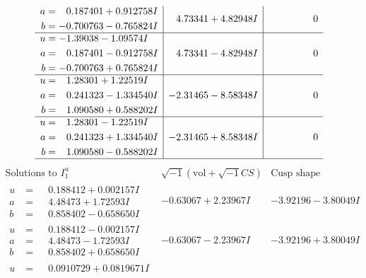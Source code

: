 \documentclass[1p]{elsarticle_modified}
\theoremstyle{definition}
\newcommand{\I}{\sqrt{-1}}
\begin{document}
$$\begin{array}{c|c|c}
\begin{aligned}
a &= \phantom{-}0.187401 + 0.912758 I \\
b &= -0.700763 - 0.765824 I\end{aligned}
 & \phantom{-}4.73341 + 4.82948 I & \phantom{-0.000000 } 0 \\ \hline\begin{aligned}
u &= -1.39038 - 1.09574 I \\
a &= \phantom{-}0.187401 - 0.912758 I \\
b &= -0.700763 + 0.765824 I\end{aligned}
 & \phantom{-}4.73341 - 4.82948 I & \phantom{-0.000000 } 0 \\ \hline\begin{aligned}
u &= \phantom{-}1.28301 + 1.22519 I \\
a &= \phantom{-}0.241323 - 1.334540 I \\
b &= \phantom{-}1.090580 + 0.588202 I\end{aligned}
 & -2.31465 - 8.58348 I & \phantom{-0.000000 } 0 \\ \hline\begin{aligned}
u &= \phantom{-}1.28301 - 1.22519 I \\
a &= \phantom{-}0.241323 + 1.334540 I \\
b &= \phantom{-}1.090580 - 0.588202 I\end{aligned}
 & -2.31465 + 8.58348 I & \phantom{-0.000000 } 0\\
 \hline 
 \end{array}$$\newpage$$\begin{array}{c|c|c}  
\text{Solutions to }I^u_{1}& \I (\text{vol} + \sqrt{-1}CS) & \text{Cusp shape}\\
 \hline 
\begin{aligned}
u &= \phantom{-}0.188412 + 0.002157 I \\
a &= \phantom{-}4.48473 + 1.72593 I \\
b &= \phantom{-}0.858402 - 0.658650 I\end{aligned}
 & -0.63067 + 2.23967 I & -3.92196 - 3.80049 I \\ \hline\begin{aligned}
u &= \phantom{-}0.188412 - 0.002157 I \\
a &= \phantom{-}4.48473 - 1.72593 I \\
b &= \phantom{-}0.858402 + 0.658650 I\end{aligned}
 & -0.63067 - 2.23967 I & -3.92196 + 3.80049 I \\ \hline\begin{aligned}
u &= \phantom{-}0.0910729 + 0.0819671 I \\

\end{aligned}
\end{array}$$
\end{document}
